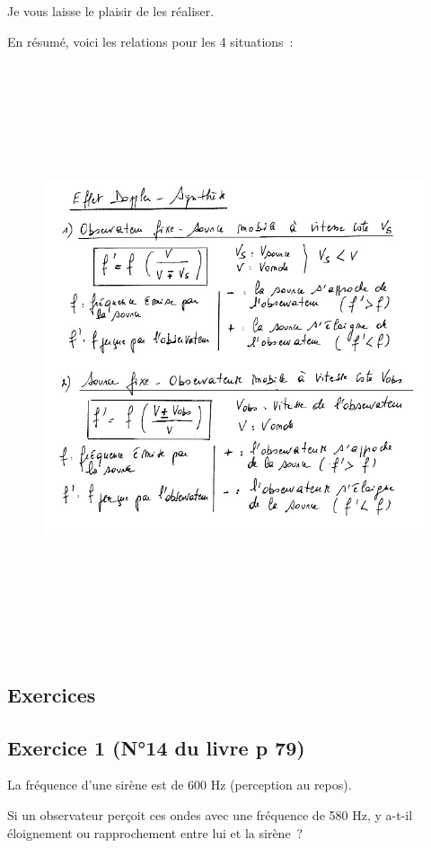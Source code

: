 Je vous laisse le plaisir de les réaliser.

En résumé, voici les relations pour les 4 situations~:
\begin{figure}
\centering
\includegraphics[width=17.866cm,height=17.32cm]{Pictures/100000010000025C00000234BE3EA55298C88B1D.png}
\caption{}
\end{figure}

\subsection{Exercices}

\subsection{Exercice 1 (N°14 du livre p 79)}

La fréquence d'une sirène est de 600 Hz (perception au repos).

Si un observateur perçoit ces ondes avec une fréquence de 580 Hz, y
a-t-il éloignement ou rapprochement entre lui et la sirène~?

